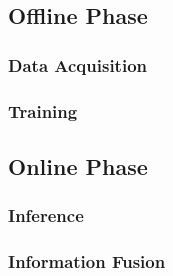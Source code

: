     \subsection{Offline Phase}

        \subsubsection{Data Acquisition}

        \subsubsection{Training}

    \subsection{Online Phase}

        \subsubsection{Inference}

        \subsubsection{Information Fusion}

